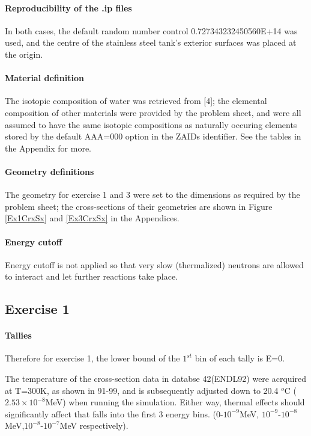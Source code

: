 \documentclass[a4paper, 12pt]{article}
\begin{document}
\paragraph{Reproducibility of the .ip files} In both cases, the default random number control 0.727343232450560E+14 was used, and the centre of the stainless steel tank's exterior surfaces was placed at the origin.
\paragraph{Material definition} The isotopic composition of water was retrieved from [4]; the elemental composition of other materials were provided by the problem sheet, and were all assumed to have the same isotopic compositions as naturally occuring elements stored by the default AAA=000 option in the ZAIDs identifier. See the tables in the Appendix for more.
\paragraph{Geometry definitions\indent} The geometry for exercise 1 and 3 were set to the dimensions as required by the problem sheet; the cross-sections of their geometries are shown in Figure \ref{Ex1CrxSx} and \ref{Ex3CrxSx} in the Appendices.
\paragraph{Energy cutoff\indent}
Energy cutoff is not applied so that very slow (thermalized) neutrons are allowed to interact and let further reactions take place.

\subsection{Exercise 1}
\paragraph{Tallies\indent}
Therefore for exercise 1, the lower bound of the $1^{st}$ bin of each tally is E=0.

The temperature of the cross-section data in databse 42(ENDL92) were acrquired at T=300K, as shown in 91-99, and is subsequently adjusted down to 20.4 ${}^{o}$C ($2.53 \times 10^{-8}$MeV) when running the simulation. Either way, thermal effects should significantly affect that falls into the first 3 energy bins. ($0$-$10^{-9}$MeV, $10^{-9}$-$10^{-8}$MeV,$10^{-8}$-$10^{-7}$MeV respectively).
\end{document}
